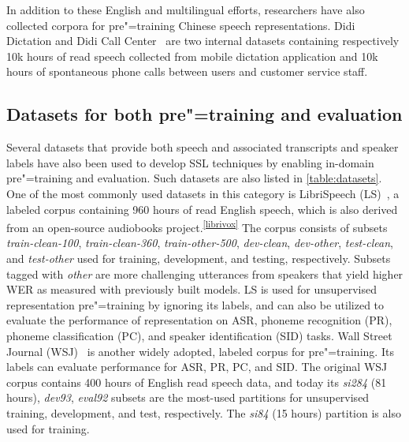 In addition to these English and multilingual efforts, researchers have also
collected corpora for pre"=training Chinese speech representations. Didi Dictation
and Didi Call Center~\parencite{jiang_improving_2019, jiang_further_2021} are two
internal datasets containing respectively 10k hours of read speech collected
from mobile dictation application and 10k hours of spontaneous phone calls
between users and customer service staff.

\subsection{Datasets for both pre"=training and evaluation}\label{sec:datasets}
Several datasets that provide both speech and associated transcripts and
speaker labels have also been used to develop SSL techniques by enabling
in-domain pre"=training and evaluation. Such datasets are also listed in
\cref{table:datasets}. One of the most commonly used datasets in this category
is LibriSpeech (LS)~\parencite{panayotov_librispeech_2015}, a labeled corpus
containing 960 hours of
read English speech, which is also derived from an open-source audiobooks
project.\textsuperscript{\ref{librivox}} The corpus consists of subsets
\textit{train-clean-100}, \textit{train-clean-360}, \textit{train-other-500},
\textit{dev-clean}, \textit{dev-other}, \textit{test-clean}, and
\textit{test-other} used for training, development, and testing, respectively.
Subsets tagged with \textit{other} are more challenging utterances from
speakers that yield higher WER as measured with previously built models. LS is
used for unsupervised representation pre"=training by ignoring its labels, and
can also be utilized to evaluate the performance of representation on ASR, phoneme recognition (PR),
phoneme classification (PC), and speaker identification (SID) tasks. Wall Street Journal (WSJ)~\parencite{paul_design_1992} is another
widely adopted, labeled corpus for pre"=training. Its labels can evaluate
performance for ASR, PR, PC, and SID. The original WSJ corpus contains 400 hours
of English read speech data, and today its \textit{si284} (81 hours),
\textit{dev93}, \textit{eval92} subsets are the most-used partitions for
unsupervised training, development, and test, respectively.  The \textit{si84}
(15 hours) partition is also used for training.

